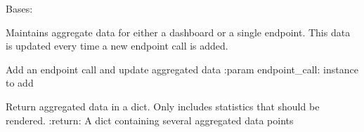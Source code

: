 \documentclass[letterpaper,10pt,english]{sphinxmanual}
\begin{document}
\begin{fulllineitems}
\label{\detokenize{pydash_app.dashboard.aggregator:pydash_app.dashboard.aggregator.Aggregator}}
Bases: 

Maintains aggregate data for either a dashboard or a single endpoint.
This data is updated every time a new endpoint call is added.

\begin{fulllineitems}
\label{\detokenize{pydash_app.dashboard.aggregator:pydash_app.dashboard.aggregator.Aggregator.add_endpoint_call}}
Add an endpoint call and update aggregated data
:param endpoint\_call:  instance to add

\end{fulllineitems}


\begin{fulllineitems}
\label{\detokenize{pydash_app.dashboard.aggregator:pydash_app.dashboard.aggregator.Aggregator.as_dict}}
Return aggregated data in a dict. Only includes statistics that should be rendered.
:return: A dict containing several aggregated data points

\end{fulllineitems}



\end{fulllineitems}
\end{document}
